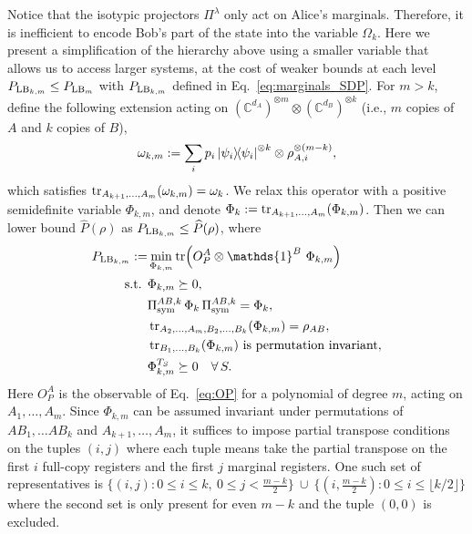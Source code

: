 \documentclass[aps,pra,twocolumn,showpacs,superscriptaddress,groupedaddress]{revtex4-2}
\newcommand{\one}[0]{\mathds{1}}
\newcommand{\C}{\mathds{C}}
\newcommand{\I}{\one}
\begin{document}
Notice that the isotypic projectors $\Pi^\lambda$ only act on Alice's marginals. Therefore, it is inefficient to encode Bob's part of the state into the variable $\Omega_k$. Here we present a simplification of the hierarchy above using a smaller variable that allows us to access larger systems, at the cost of weaker bounds at each level $P_{{\rm LB}_{k,m}} \leq P_{{\rm LB}_m}$ with $P_{{\rm LB}_{k,m}}$ defined in Eq.~\eqref{eq:marginals_SDP}. For $m > k$, define the following extension acting on $(\C^{d_A})^{\otimes m}\otimes(\C^{d_B})^{\otimes k}$ (i.e., $m$ copies of $A$ and $k$ copies of $B$),
\begin{equation}
    \omega_{k,m} := \sum_i p_i \dyad{\psi_i}^{\otimes k}\otimes \rho_{A,i}^{\otimes (m-k)},
\end{equation}
which satisfies $\tr_{A_{k+1}, \dots, A_m}(\omega_{k,m})=\omega_k$. We relax this operator with a positive semidefinite variable $\Phi_{k,m}$, and denote $\Phi_{k}:=\tr_{A_{k+1}, \dots, A_m}(\Phi_{k,m})$.
Then we can lower bound $\widehat{P}(\rho)$ as $P_{{\rm LB}_{k,m}}\leq \widehat{P}(\rho)$, where
\begin{align}\label{eq:marginals_SDP}
    P_{{\rm LB}_{k,m}}:=&\min_{\Phi_{k,m}} \tr(O_P^A \otimes \I^B \ \Phi_{k,m})\\
    \text{s.t. } & \Phi_{k,m}\succeq 0, \nonumber\\
    & \Pi_\text{sym}^{AB,k} \, \Phi_{k}\, \Pi_\text{sym}^{AB,k}= \Phi_{k},\nonumber\\
    & \tr_{A_2,\dots,A_m,B_2,\dots,B_k} (\Phi_{k,m}) = \rho_{AB}, \nonumber\\
    & \tr_{B_1,\dots,B_k}(\Phi_{k,m}) \text{ is permutation invariant},\nonumber\\
    & \Phi_{k,m}^{T_S} \succeq 0 \quad  \forall \, S.\nonumber
\end{align}
Here $O_P^A$ is the observable of Eq.~\eqref{eq:OP} for a polynomial of degree $m$, acting on $A_1,\dots,A_m$. Since $\Phi_{k,m}$ can be assumed invariant under permutations of $AB_1, \dots AB_k$ and $A_{k+1}, \dots, A_m$, it suffices to impose partial transpose conditions on the tuples $(i, j)$ where each tuple means take the partial transpose on the first $i$ full-copy registers and the first $j$ marginal registers. One such set of representatives is $\{(i,j):0\leq i\leq k,\ 0\leq j<\tfrac{m-k}{2}\}\ \cup\ \{(i,\tfrac{m-k}{2}):0\leq i\leq\lfloor k/2\rfloor\}$ where the second set is only present for even $m-k$ and the tuple $(0,0)$ is excluded.


\end{document}
